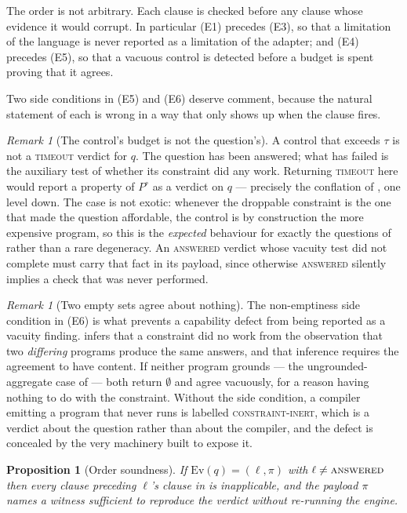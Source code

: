 \documentclass[11pt,a4paper]{article}
\theoremstyle{plain}
\newtheorem{proposition}[theorem]{Proposition}
\theoremstyle{definition}
\theoremstyle{remark}
\newtheorem{remark}[theorem]{Remark}
\newcommand{\vans}{\textsc{answered}}
\newcommand{\vtime}{\textsc{timeout}}
\newcommand{\vinert}{\textsc{constraint-inert}}
\newcommand{\qq}{q}
\begin{document}
The order is not arbitrary. Each clause is checked before any clause whose
evidence it would corrupt. In particular (E1) precedes (E3), so that a
limitation of the language is never reported as a limitation of the adapter;
and (E4) precedes (E5), so that a vacuous control is detected before a budget
is spent proving that it agrees.

Two side conditions in (E5) and (E6) deserve comment, because the natural
statement of each is wrong in a way that only shows up when the clause fires.

\begin{remark}[The control's budget is not the question's]
\label{rem:control-budget}
A control that exceeds $\tau$ is not a \vtime{} verdict for $\qq$. The question
has been answered; what has failed is the auxiliary test of whether its
constraint did any work. Returning \vtime{} here would report a property of
$P^\circ$ as a verdict on $\qq$ --- precisely the conflation of
, one level down. The case is not exotic: whenever the
droppable constraint is the one that made the question affordable, the control
is by construction the more expensive program, so this is the \emph{expected}
behaviour for exactly the questions of  rather than
a rare degeneracy. An \vans{} verdict whose vacuity test did not complete must
carry that fact in its payload, since otherwise \vans{} silently implies a
check that was never performed.
\end{remark}

\begin{remark}[Two empty sets agree about nothing]
\label{rem:empty-agreement}
The non-emptiness side condition in (E6) is what prevents a capability defect
from being reported as a vacuity finding.  infers that a
constraint did no work from the observation that two \emph{differing} programs
produce the same answers, and that inference requires the agreement to have
content. If neither program grounds --- the ungrounded-aggregate case of
 --- both return $\emptyset$ and agree vacuously, for a reason
having nothing to do with the constraint. Without the side condition, a
compiler emitting a program that never runs is labelled \vinert, which is a
verdict about the question rather than about the compiler, and the defect is
concealed by the very machinery built to expose it.
\end{remark}

\begin{proposition}[Order soundness]
\label{prop:order}
If $\mathrm{Ev}(\qq) = (\ell, \pi)$ with $\ell \neq \vans$ then every clause
preceding $\ell$'s clause in  is inapplicable, and the
payload $\pi$ names a witness sufficient to reproduce the verdict without
re-running the engine.
\end{proposition}
\end{document}

